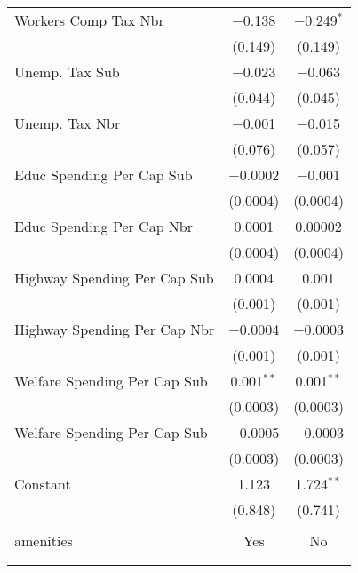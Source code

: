 \begin{table}[!htbp]
\begin{tabular}{@{\extracolsep{5pt}}lcc}
  Workers Comp Tax Nbr & $-$0.138 & $-$0.249$^{*}$ \\ 
  & (0.149) & (0.149) \\ 
  Unemp. Tax Sub & $-$0.023 & $-$0.063 \\ 
  & (0.044) & (0.045) \\ 
  Unemp. Tax Nbr & $-$0.001 & $-$0.015 \\ 
  & (0.076) & (0.057) \\ 
  Educ Spending Per Cap Sub & $-$0.0002 & $-$0.001 \\ 
  & (0.0004) & (0.0004) \\ 
  Educ Spending Per Cap Nbr & 0.0001 & 0.00002 \\ 
  & (0.0004) & (0.0004) \\ 
  Highway Spending Per Cap Sub & 0.0004 & 0.001 \\ 
  & (0.001) & (0.001) \\ 
  Highway Spending Per Cap Nbr & $-$0.0004 & $-$0.0003 \\ 
  & (0.001) & (0.001) \\ 
  Welfare Spending Per Cap Sub & 0.001$^{**}$ & 0.001$^{**}$ \\ 
  & (0.0003) & (0.0003) \\ 
  Welfare Spending Per Cap Sub & $-$0.0005 & $-$0.0003 \\ 
  & (0.0003) & (0.0003) \\ 
  Constant & 1.123 & 1.724$^{**}$ \\ 
  & (0.848) & (0.741) \\ 
 \hline \\[-1.8ex] 
amenities & Yes & No \\ 
\hline \\[-1.8ex] 
\hline 
\hline \\[-1.8ex] 
\end{tabular} 
\end{table} 
